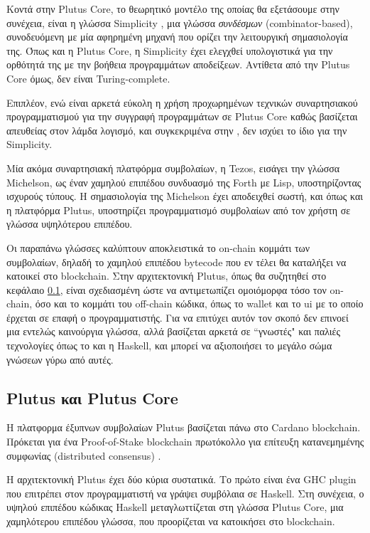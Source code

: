 Κοντά στην Plutus Core, το θεωρητικό μοντέλο της οποίας θα εξετάσουμε στην συνέχεια,
είναι η γλώσσα Simplicity \cite{simplicity}, μια γλώσσα \emph{συνδέσμων} (combinator-based),
συνοδευόμενη με μία αφηρημένη μηχανή που ορίζει την λειτουργική σημασιολογία της. Όπως
και η Plutus Core, η Simplicity έχει ελεγχθεί υπολογιστικά για την ορθότητά της με την βοήθεια
προγραμμάτων αποδείξεων. Αντίθετα από την Plutus Core όμως, δεν είναι Turing-complete.

Επιπλέον, ενώ είναι αρκετά εύκολη η χρήση προχωρημένων τεχνικών συναρτησιακού προγραμματισμού
για την συγγραφή προγραμμάτων σε Plutus Core καθώς βασίζεται απευθείας στον λάμδα λογισμό, και
συγκεκριμένα στην \FOM{}, δεν ισχύει το ίδιο για την Simplicity.


Μία ακόμα συναρτησιακή πλατφόρμα συμβολαίων, η Tezos, εισάγει την γλώσσα Michelson,
ως έναν χαμηλού επιπέδου συνδυασμό της Forth με Lisp, υποστηρίζοντας ισχυρούς τύπους.
 Η σημασιολογία της
Michelson έχει αποδειχθεί σωστή, και όπως και η πλατφόρμα Plutus, υποστηρίζει προγραμματισμό
συμβολαίων από τον χρήστη σε γλώσσα υψηλότερου επιπέδου.


Οι παραπάνω γλώσσες καλύπτουν αποκλειστικά το on-chain κομμάτι των συμβολαίων, δηλαδή
το χαμηλού επιπέδου bytecode που εν τέλει θα καταλήξει να κατοικεί στο blockchain. Στην
αρχιτεκτονική Plutus, όπως θα συζητηθεί στο κεφάλαιο \ref{subsec:plutus}, είναι σχεδιασμένη
ώστε να αντιμετωπίζει ομοιόμορφα τόσο τον on-chain, όσο και το κομμάτι του off-chain κώδικα,
όπως το wallet και το ui με το οποίο έρχεται σε επαφή ο προγραμματιστής. Για να επιτύχει αυτόν
τον σκοπό δεν επινοεί μια εντελώς καινούργια γλώσσα, αλλά βασίζεται αρκετά σε ``γνωστές" και
παλιές τεχνολογίες όπως το \FOM και η Haskell, και μπορεί να αξιοποιήσει το μεγάλο σώμα γνώσεων
γύρω από αυτές.


\subsection{Plutus και Plutus Core}
\label{subsec:plutus}

Η πλατφορμα έξυπνων συμβολαίων Plutus βασίζεται πάνω στο Cardano blockchain. Πρόκεται για ένα
Proof-of-Stake blockchain πρωτόκολλο για επίτευξη κατανεμημένης συμφωνίας (distributed consensus) \cite{ouroboros}.

Η αρχιτεκτονική Plutus έχει δύο κύρια συστατικά. Το πρώτο είναι ένα GHC plugin που επιτρέπει στον
προγραμματιστή να γράψει συμβόλαια σε Haskell.  Στη συνέχεια, ο υψηλού επιπέδου κώδικας Haskell
μεταγλωττίζεται στη γλώσσα Plutus Core, μια χαμηλότερου επιπέδου γλώσσα, που προορίζεται να
κατοικήσει στο blockchain.


